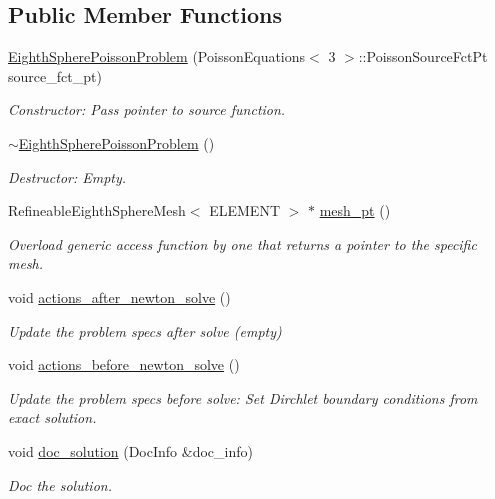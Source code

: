 \subsection*{Public Member Functions}
\begin{DoxyCompactItemize}
\item 
\hyperlink{classEighthSpherePoissonProblem_ae51db2c3e80f0d5628e4d81eb1c11db4}{Eighth\+Sphere\+Poisson\+Problem} (Poisson\+Equations$<$ 3 $>$\+::Poisson\+Source\+Fct\+Pt source\+\_\+fct\+\_\+pt)
\begin{DoxyCompactList}\small\item\em Constructor\+: Pass pointer to source function. \end{DoxyCompactList}\item 
\hyperlink{classEighthSpherePoissonProblem_a043c7aa08c939fdc019870ad2c2270cc}{$\sim$\+Eighth\+Sphere\+Poisson\+Problem} ()
\begin{DoxyCompactList}\small\item\em Destructor\+: Empty. \end{DoxyCompactList}\item 
Refineable\+Eighth\+Sphere\+Mesh$<$ E\+L\+E\+M\+E\+NT $>$ $\ast$ \hyperlink{classEighthSpherePoissonProblem_aa33edbb75ba8fe8d4daac3c940a7ff6a}{mesh\+\_\+pt} ()
\begin{DoxyCompactList}\small\item\em Overload generic access function by one that returns a pointer to the specific mesh. \end{DoxyCompactList}\item 
void \hyperlink{classEighthSpherePoissonProblem_a480189fe5d2f42fe3ff6062d5f151ea3}{actions\+\_\+after\+\_\+newton\+\_\+solve} ()
\begin{DoxyCompactList}\small\item\em Update the problem specs after solve (empty) \end{DoxyCompactList}\item 
void \hyperlink{classEighthSpherePoissonProblem_af82dd7abdf631950a68c997af314be5d}{actions\+\_\+before\+\_\+newton\+\_\+solve} ()
\begin{DoxyCompactList}\small\item\em Update the problem specs before solve\+: Set Dirchlet boundary conditions from exact solution. \end{DoxyCompactList}\item 
void \hyperlink{classEighthSpherePoissonProblem_ac8e9911536d04bab829cfe92bb40e302}{doc\+\_\+solution} (Doc\+Info \&doc\+\_\+info)
\begin{DoxyCompactList}\small\item\em Doc the solution. \end{DoxyCompactList}\end{DoxyCompactItemize}
